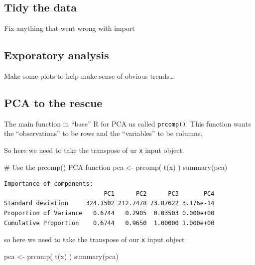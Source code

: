 \documentclass[
  letterpaper,
  DIV=11,
  numbers=noendperiod]{scrartcl}
\newenvironment{Shaded}{\begin{snugshade}}{\end{snugshade}}
\newcommand{\CommentTok}[1]{\textcolor[rgb]{0.37,0.37,0.37}{#1}}
\newcommand{\FunctionTok}[1]{\textcolor[rgb]{0.28,0.35,0.67}{#1}}
\newcommand{\NormalTok}[1]{\textcolor[rgb]{0.00,0.23,0.31}{#1}}
\newcommand{\OtherTok}[1]{\textcolor[rgb]{0.00,0.23,0.31}{#1}}
\begin{document}
\subsection{Tidy the data}\label{tidy-the-data}

Fix anything that went wrong with import

\subsection{Exporatory analysis}\label{exporatory-analysis}

Make some plots to help make sense of obvious trends\ldots{}

\subsection{PCA to the rescue}\label{pca-to-the-rescue}

The main function in ``base'' R for PCA us called \texttt{prcomp()}.
This function wants the ``observations'' to be rows and the
``variables'' to be columns.

So here we need to take the transpose of ur \texttt{x} input object.

\begin{Shaded}
\begin{Highlighting}[]
\CommentTok{\# Use the prcomp() PCA function }
\NormalTok{pca }\OtherTok{\textless{}{-}} \FunctionTok{prcomp}\NormalTok{( }\FunctionTok{t}\NormalTok{(x) )}
\FunctionTok{summary}\NormalTok{(pca)}
\end{Highlighting}
\end{Shaded}

\begin{verbatim}
Importance of components:
                            PC1      PC2      PC3       PC4
Standard deviation     324.1502 212.7478 73.87622 3.176e-14
Proportion of Variance   0.6744   0.2905  0.03503 0.000e+00
Cumulative Proportion    0.6744   0.9650  1.00000 1.000e+00
\end{verbatim}

so here we need to take the transpose of our \texttt{x} input object

\begin{Shaded}
\begin{Highlighting}[]
\NormalTok{pca }\OtherTok{\textless{}{-}} \FunctionTok{prcomp}\NormalTok{( }\FunctionTok{t}\NormalTok{(x) )}
\FunctionTok{summary}\NormalTok{(pca)}
\end{Highlighting}
\end{Shaded}
\end{document}
